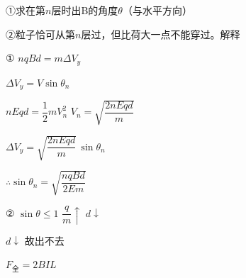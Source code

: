 \begin{problem}
①求在第$n$层时出B的角度$\theta$（与水平方向）

②粒子恰可从第$n$层过，但比荷大一点不能穿过。解释
\begin{solution}
① $nqBd=m\Delta V_y$

$\Delta V_y=V\sin\theta_n$

$nEqd=\dfrac12 mV_n^{2}$ \qquad $V_n=\sqrt{\dfrac{2nEqd}{m}}$

$\Delta V_y=\sqrt{\dfrac{2nEqd}{m}}\,\sin\theta_n$

$\therefore\sin\theta_n=\sqrt{\dfrac{nqBd}{2Em}}$ %

② $\sin\theta\le1$ \qquad $\dfrac{q}{m}\uparrow$ \qquad $d\downarrow$

$d\downarrow$ 故出不去
\end{solution}
\end{problem}

$F_{\text{全}}=2BIL$

